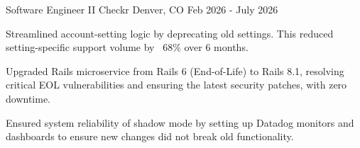   \cventry
    {Software Engineer II} %
    {Checkr} %
    {Denver, CO} %
    {Feb 2026 - July 2026} %
    {
        \begin{cvitems}
            \item{Streamlined account-setting logic by deprecating old settings. This reduced setting-specific support volume by ~68\% over 6 months.}
            \item{Upgraded Rails microservice from Rails 6 (End-of-Life) to Rails 8.1, resolving critical EOL vulnerabilities and ensuring the latest security patches, with zero downtime.}
            \item{Ensured system reliability of shadow mode by setting up Datadog monitors and dashboards to ensure new changes did not break old functionality.}
        \end{cvitems}
    }
